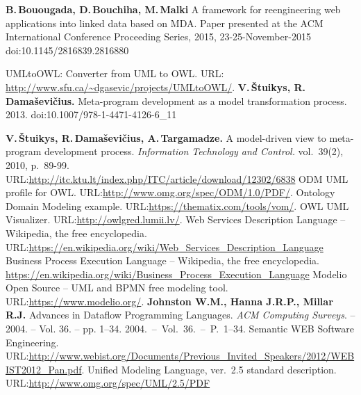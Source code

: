 \documentclass[runningheads]{llncs}
\begin{document}
\begin{thebibliography}{11}

\textbf{B.\,Bouougada, D.\,Bouchiha, M.\,Malki} A framework for
reengineering web applications into linked data based on MDA. Paper
presented at the ACM International Conference Proceeding Series, 2015,
23-25-November-2015 doi:10.1145/2816839.2816880


 UMLtoOWL: Converter from UML to OWL. URL: \url{http://www.sfu.ca/~dgasevic/projects/UMLtoOWL/}.
\textbf{V.\,\v{S}tuikys, R.\,Dama\v{s}evi\v{c}ius.} Meta-program development as a
model transformation process. 2013. doi:10.1007/978-1-4471-4126-6\_11

\textbf{V.\,\v{S}tuikys, R.\,Dama\v{s}evi\v{c}ius, A.\,Targamadze.} A model-driven
view to meta-program development process. \emph{Information Technology and
Control.} vol.~39(2), 2010, p.~89-99. URL:\url{http://itc.ktu.lt/index.php/ITC/article/download/12302/6838}
 ODM UML profile for OWL. URL:\url{http://www.omg.org/spec/ODM/1.0/PDF/}.
 Ontology Domain Modeling example. URL:\url{https://thematix.com/tools/vom/}.
 OWL UML Visualizer. URL:\url{http://owlgred.lumii.lv/}.
 Web Services Description Language -- Wikipedia, the free encyclopedia.  URL:\url{https://en.wikipedia.org/wiki/Web_Services_Description_Language}
 Business Process Execution Language -- Wikipedia, the free encyclopedia. \url{https://en.wikipedia.org/wiki/Business_Process_Execution_Language}
 Modelio Open Source -- UML and BPMN free modeling tool. URL:\url{https://www.modelio.org/}.
 \textbf{Johnston W.M., Hanna J.R.P., Millar R.J.} Advances in Dataflow Programming Languages.
  \emph{ACM Computing Surveys}. -- 2004. -- Vol. 36. -- pp. 1--34.
  2004.~--~Vol.~36.~--~P.~1--34.
 Semantic WEB Software Engineering. URL:\url{http://www.webist.org/Documents/Previous\_Invited\_Speakers/2012/WEBIST2012\_Pan.pdf}. %
 Unified Modeling Language, ver.~2.5 standard description. URL:\url{http://www.omg.org/spec/UML/2.5/PDF}



\end{thebibliography}




\end{document}
